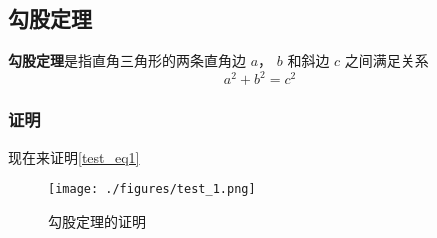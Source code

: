 
\subsection{勾股定理}
\textbf{勾股定理}是指直角三角形的两条直角边 $a$， $b$ 和斜边 $c$ 之间满足关系
\begin{equation}\label{test_eq1}
a^2 + b^2 = c^2
\end{equation}

\subsubsection{证明}
现在来证明\autoref{test_eq1}

\begin{figure}[ht]
\centering
\texttt{[image: ./figures/test\_1.png]}
\caption{勾股定理的证明} \label{test_fig1}
\end{figure}

